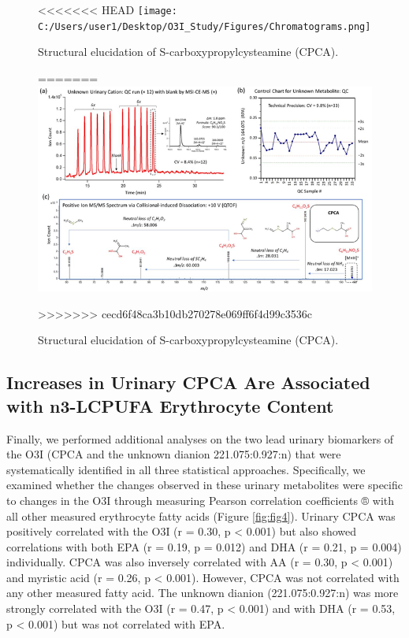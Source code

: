 \documentclass[journal=jacsat,manuscript=article]{achemso}
\begin{document}
\begin{figure}
<<<<<<< HEAD
\centering
\texttt{[image: C:/Users/user1/Desktop/O3I\_Study/Figures/Chromatograms.png]}
\caption{Structural elucidation of S-carboxypropylcysteamine
(CPCA).}\label{fig:fig3}
=======
\includegraphics[width=0.8\linewidth]{../Figures/Chromatograms} \caption{Structural elucidation of S-carboxypropylcysteamine (CPCA).}\label{fig:unnamed-chunk-3}
>>>>>>> cecd6f48ca3b10db270278e069ff6f4d99c3536c
\end{figure}

\subsection{Increases in Urinary CPCA Are Associated with n3-LCPUFA
Erythrocyte
Content}\label{increases-in-urinary-cpca-are-associated-with-n3-lcpufa-erythrocyte-content}

Finally, we performed additional analyses on the two lead urinary
biomarkers of the O3I (CPCA and the unknown dianion 221.075:0.927:n)
that were systematically identified in all three statistical approaches.
Specifically, we examined whether the changes observed in these urinary
metabolites were specific to changes in the O3I through measuring
Pearson correlation coefficients ® with all other measured erythrocyte
fatty acids (Figure \ref{fig:fig4}). Urinary CPCA was positively
correlated with the O3I (r = 0.30, p \textless{} 0.001) but also showed
correlations with both EPA (r = 0.19, p = 0.012) and DHA (r = 0.21, p =
0.004) individually. CPCA was also inversely correlated with AA (r =
0.30, p \textless{} 0.001) and myristic acid (r = 0.26, p \textless{}
0.001). However, CPCA was not correlated with any other measured fatty
acid. The unknown dianion (221.075:0.927:n) was more strongly correlated
with the O3I (r = 0.47, p \textless{} 0.001) and with DHA (r = 0.53, p
\textless{} 0.001) but was not correlated with EPA.
\end{document}
